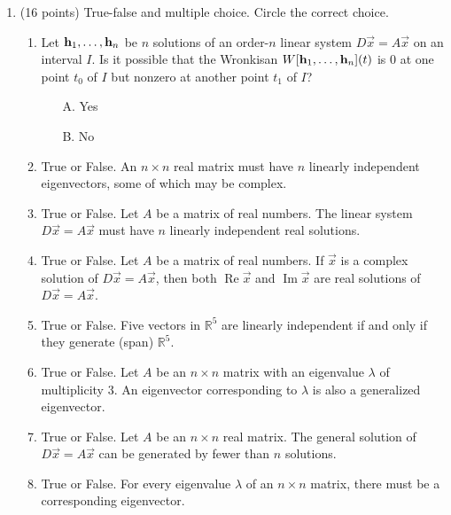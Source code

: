 \documentclass[12pt]{article}
\def\R{{\mathbb R}}
\newcommand{\bh}{{\bf h}}
\newcommand{\bx}{\vec{x}}
\newcommand{\Real}{\operatorname{Re}}
\newcommand{\Imag}{\operatorname{Im}}
\begin{document}
\begin{enumerate}

\item (16 points)  True-false and multiple choice.  Circle the correct choice.
  \begin{enumerate}
  \setlength{\itemsep}{10mm}
  

\item Let $\bh_1, \ldots, \bh_n$ be $n$ solutions of an order-$n$
  linear system $D\bx=A\bx$ on an
  interval $I$.  Is it possible that the Wronkisan $W[\bh_1, \ldots,
  \bh_n](t)$ is 0 at one point $t_0$ of $I$ but nonzero at another
  point $t_1$ of $I$?
  
  \bigskip
  
      \begin{enumerate}
      \item[A.] Yes
      \item[B.] No
      \end{enumerate}


     \item True or False.  An $n\times n$ real matrix must have $n$ linearly
       independent eigenvectors, some of which may be complex.


       \item True or False.  Let $A$ be a matrix of real numbers.  The linear system
         $D\bx = A \bx$ must have $n$ linearly independent real
         solutions.

         \item True or False. Let $A$ be a matrix of real numbers. If $\bx$ is a
           complex solution of $D\bx = A\bx$, then both $\Real \bx$ and
           $\Imag \bx$ are real solutions of $D\bx = A\bx$.

          \item True or False.  Five vectors in $\R^5$ are linearly independent if
            and only if they generate (span) $\R^5$.

            \item True or False.   Let $A$ be an $n \times n$ matrix with an eigenvalue
              $\lambda$ of multiplicity $3$.  An eigenvector
              corresponding to $\lambda$ is also a generalized eigenvector.

          \item True or False.  Let $A$ be an $n \times n$ real matrix.  The general
            solution of $D\bx = A\bx$ can be generated by fewer than
            $n$ solutions.

          \item True or False. For every eigenvalue $\lambda$ of an $n \times n$
            matrix, there must be a corresponding eigenvector.
\end{enumerate}
            \newpage
            

\end{enumerate}
\end{document}
